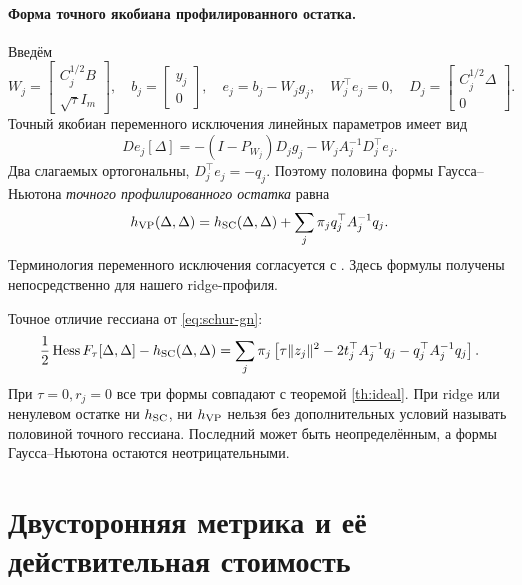 \documentclass[11pt,a4paper]{article}
\newcommand{\Hess}{\operatorname{Hess}}
\newcommand{\norm}[1]{\lVert#1\rVert}
\theoremstyle{remark}
\begin{document}
\paragraph{Форма точного якобиана профилированного остатка.}
Введём
\[
 W_j=\begin{bmatrix}C_j^{1/2}B\\\sqrt\tau I_m\end{bmatrix},\quad
 b_j=\begin{bmatrix}y_j\\0\end{bmatrix},\quad
 e_j=b_j-W_jg_j,\quad W_j^\top e_j=0,
 \quad D_j=\begin{bmatrix}C_j^{1/2}\Delta\\0\end{bmatrix}.
\]
Точный якобиан переменного исключения линейных параметров имеет вид
\[
 De_j[\Delta]=-(I-P_{W_j})D_jg_j
              -W_jA_j^{-1}D_j^\top e_j.
\]
Два слагаемых ортогональны, $D_j^\top e_j=-q_j$. Поэтому половина
формы Гаусса--Ньютона \emph{точного профилированного остатка} равна
\begin{equation}\label{eq:varpro-gn}
 h_{\rm VP}(\Delta,\Delta)=
 h_{\rm SC}(\Delta,\Delta)+\sum_j\pi_jq_j^\top A_j^{-1}q_j.
\end{equation}
Терминология переменного исключения согласуется с \cite{varpro}.
Здесь формулы получены непосредственно для нашего ridge-профиля.

Точное отличие гессиана от \eqref{eq:schur-gn}:
\begin{equation}\label{eq:hessian-difference}
 \frac12\Hess F_\tau[\Delta,\Delta]-h_{\rm SC}(\Delta,\Delta)
 =\sum_j\pi_j\left[
 \tau\norm{z_j}^2-2t_j^\top A_j^{-1}q_j-q_j^\top A_j^{-1}q_j
 \right].
\end{equation}
При $\tau=0,r_j=0$ все три формы совпадают с теоремой
\ref{th:ideal}. При ridge или ненулевом остатке ни
$h_{\rm SC}$, ни $h_{\rm VP}$ нельзя без дополнительных условий называть
половиной точного гессиана. Последний может быть неопределённым, а формы
Гаусса--Ньютона остаются неотрицательными.

\section{Двусторонняя метрика и её действительная стоимость}
\end{document}
